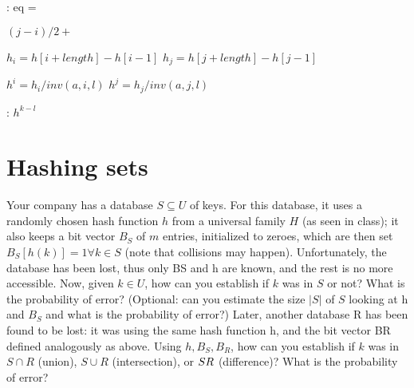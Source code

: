 \documentclass{article}
\begin{document}
\begin{algorithmic}[1]
  :
    \State eq = \;

        \Else $(j - i) / 2 + $      %
    \EndIf

    \State $h_i = h[i + length] - h[i - 1]$\;
    \State $h_j = h[j + length] - h[j - 1]$\;

    \State $h^{i} = h_i / inv(a, i, l)$\;
    \State $h^{j} = h_j / inv(a, j, l)$\;

    \;
    \EndFunction

    :
    \Return $h^{k - l}$
    \EndFunction
\end{algorithmic}


\newpage
\section{Hashing sets}

Your company has a database $S \subseteq U$ of keys. For this database, it uses
a randomly chosen hash function $h$ from a universal family $H$ (as seen in class);
it also keeps a bit vector $B_S$ of $m$ entries, initialized to zeroes, which are
then set $B_S[h(k)] = 1 \forall k \in S$ (note that collisions may happen).
Unfortunately, the database has been lost, thus only BS and h are known, and the
rest is no more accessible.
Now, given $k \in U$, how can you establish if $k$ was in $S$ or not?
What is the probability of error? (Optional: can you estimate the size $|S|$ of
$S$ looking at h and $B_S$ and what is the probability of error?)
Later, another database R has been found to be lost: it was using the same hash
function h, and the bit vector BR defined analogously as above.
Using $h, B_S, B_R$, how can you establish if $k$ was in $S \cap R$ (union), $S \cup R$
(intersection), or $S \\ R$ (difference)? What is the probability of error?
\end{document}
